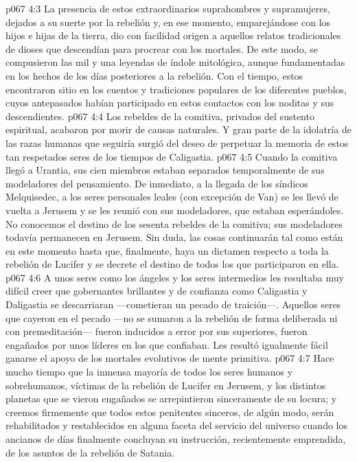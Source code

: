 \vs p067 4:3 La presencia de estos extraordinarios suprahombres y supramujeres, dejados a su suerte por la rebelión y, en ese momento, emparejándose con los hijos e hijas de la tierra, dio con facilidad origen a aquellos relatos tradicionales de dioses que descendían para procrear con los mortales. De este modo, se compusieron las mil y una leyendas de índole mitológica, aunque fundamentadas en los hechos de los días posteriores a la rebelión. Con el tiempo, estos encontraron sitio en los cuentos y tradiciones populares de los diferentes pueblos, cuyos antepasados habían participado en estos contactos con los noditas y sus descendientes.
\vs p067 4:4 Los rebeldes de la comitiva, privados del sustento espiritual, acabaron por morir de causas naturales. Y gran parte de la idolatría de las razas humanas que seguiría surgió del deseo de perpetuar la memoria de estos tan respetados seres de los tiempos de Caligastia.
\vs p067 4:5 Cuando la comitiva llegó a Urantia, sus cien miembros estaban separados temporalmente de sus modeladores del pensamiento. De inmediato, a la llegada de los síndicos Melquisedec, a los seres personales leales (con excepción de Van) se les llevó de vuelta a Jerusem y se les reunió con sus modeladores, que estaban esperándoles. No conocemos el destino de los sesenta rebeldes de la comitiva; sus modeladores todavía permanecen en Jerusem. Sin duda, las cosas continuarán tal como están en este momento hasta que, finalmente, haya un dictamen respecto a toda la rebelión de Lucifer y se decrete el destino de todos los que participaron en ella.
\vs p067 4:6 \pc A unos seres como los ángeles y los seres intermedios les resultaba muy difícil creer que gobernantes brillantes y de confianza como Caligastia y Daligastia se descarriaran ---cometieran un pecado de traición---. Aquellos seres que cayeron en el pecado ---no se sumaron a la rebelión de forma deliberada ni con premeditación--- fueron inducidos a error por sus superiores, fueron engañados por unos líderes en los que confiaban. Les resultó igualmente fácil ganarse el apoyo de los mortales evolutivos de mente primitiva.
\vs p067 4:7 Hace mucho tiempo que la inmensa mayoría de todos los seres humanos y sobrehumanos, víctimas de la rebelión de Lucifer en Jerusem, y los distintos planetas que se vieron engañados se arrepintieron sinceramente de su locura; y creemos firmemente que todos estos penitentes sinceros, de algún modo, serán rehabilitados y restablecidos en alguna faceta del servicio del universo cuando los ancianos de días finalmente concluyan su instrucción, recientemente emprendida, de los asuntos de la rebelión de Satania.
